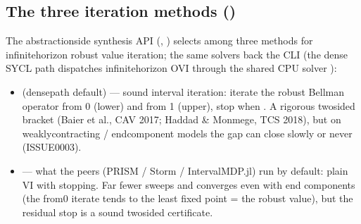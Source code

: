 \documentclass[a4paper,10pt,english]{sphinxmanual}
\begin{document}
\subsection{The three iteration methods ()}
\label{\detokenize{manual/engines:the-three-iteration-methods-iterationmethod}}
\sphinxAtStartPar
The abstraction\sphinxhyphen{}side synthesis API (, ) selects
among three methods for infinite\sphinxhyphen{}horizon robust value iteration; the same solvers back
the CLI (the dense SYCL path dispatches infinite\sphinxhyphen{}horizon OVI through the shared CPU
solver ):
\begin{itemize}
\item {} 
\sphinxAtStartPar
{} (dense\sphinxhyphen{}path default) — sound interval iteration: iterate the
robust Bellman operator from 0 (lower) and from 1 (upper), stop when
. A rigorous two\sphinxhyphen{}sided bracket (Baier et al., CAV 2017;
Haddad \& Monmege, TCS 2018), but on weakly\sphinxhyphen{}contracting / end\sphinxhyphen{}component models the
gap can close slowly or never (ISSUE\sphinxhyphen{}0003).

\item {} 
\sphinxAtStartPar
{} — what the peers (PRISM / Storm / IntervalMDP.jl) run by
default: plain VI with  stopping. Far fewer sweeps and converges even with
end components (the from\sphinxhyphen{}0 iterate tends to the least fixed point = the robust
value), but the residual stop is  a sound two\sphinxhyphen{}sided certificate.


\end{itemize}
\end{document}
